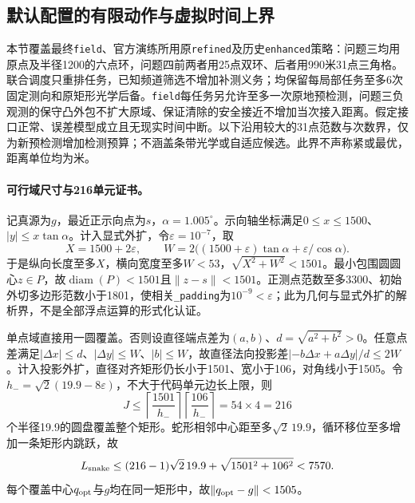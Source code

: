 \subsection{默认配置的有限动作与虚拟时间上界}
\label{sec:default-finite-bound}
本节覆盖最终\texttt{field}、官方演练所用原\texttt{refined}及历史\texttt{enhanced}策略：问题三均用原点及半径1200的六点环，问题四前两者用25点双环、后者用990米31点三角格。联合调度只重排任务，已知频道筛选不增加补测义务；均保留每局部任务至多6次固定测向和原矩形光学后备。\texttt{field}每任务另允许至多一次原地预检测，问题三负观测的保守凸外包不扩大原域、保证清除的安全接近不增加当次接入距离。假定接口正常、误差模型成立且无现实时间中断。以下沿用较大的31点范数与次数界，仅为新预检测增加检测预算；不涵盖条带光学或自适应候选。此界不声称紧或最优，距离单位均为米。

\paragraph{可行域尺寸与216单元证书。}
记真源为$g$，最近正示向点为$s$，$\alpha=1.005^\circ$。示向轴坐标满足$0\le x\le1500$、$|y|\le x\tan\alpha$。计入显式外扩，令$\varepsilon=10^{-7}$，取
\[
 X=1500+2\varepsilon,\qquad
 W=2\bigl((1500+\varepsilon)\tan\alpha+\varepsilon/\cos\alpha\bigr).
\]
于是纵向长度至多$X$，横向宽度至多$W<53$，$\sqrt{X^2+W^2}<1501$。最小包围圆圆心$z\in P$，故$\operatorname{diam}(P)<1501$且$\|z-s\|<1501$。正测点范数至多3300、初始外切多边形范数小于1801，使相关\texttt{\_padding}为$10^{-9}<\varepsilon$；此为几何与显式外扩的解析界，不是全部浮点运算的形式化认证。

单点域直接用一圆覆盖。否则设直径端点差为$(a,b)$、$d=\sqrt{a^2+b^2}>0$。任意点差满足$|\Delta x|\le d$、$|\Delta y|\le W$、$|b|\le W$，故直径法向投影差$|-b\Delta x+a\Delta y|/d\le2W$。计入投影外扩，直径对齐矩形仍长小于1501、宽小于106，对角线小于1505。令$h_-=\sqrt2(19.9-8\varepsilon)$，不大于代码单元边长上限，则
\begin{equation}
 J\le\left\lceil\frac{1501}{h_-}\right\rceil
       \left\lceil\frac{106}{h_-}\right\rceil
   =54\times4=216
\end{equation}
个半径19.9的圆盘覆盖整个矩形。蛇形相邻中心距至多$\sqrt2\,19.9$，循环移位至多增加一条矩形内跳跃，故
\begin{equation}
 L_{\rm snake}\le(216-1)\sqrt2\,19.9+\sqrt{1501^2+106^2}<7570.
\end{equation}
每个覆盖中心$q_{\rm opt}$与$g$均在同一矩形中，故$\|q_{\rm opt}-g\|<1505$。

